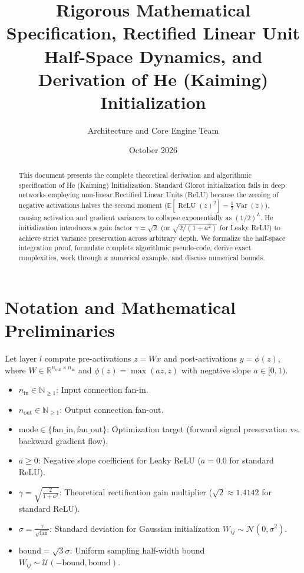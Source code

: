 \documentclass[11pt,a4paper]{article}
\title{\textbf{Rigorous Mathematical Specification, Rectified Linear Unit Half-Space Dynamics, and Derivation of He (Kaiming) Initialization}}
\author{Architecture and Core Engine Team}
\date{October 2026}
\theoremstyle{definition}
\begin{document}
\maketitle

\begin{abstract}
This document presents the complete theoretical derivation and algorithmic specification of He (Kaiming) Initialization. Standard Glorot initialization fails in deep networks employing non-linear Rectified Linear Units (ReLU) because the zeroing of negative activations halves the second moment ($\mathbb{E}[\operatorname{ReLU}(z)^2] = \frac{1}{2} \operatorname{Var}(z)$), causing activation and gradient variances to collapse exponentially as $(1/2)^L$. He initialization introduces a gain factor $\gamma = \sqrt{2}$ (or $\sqrt{2 / (1 + a^2)}$ for Leaky ReLU) to achieve strict variance preservation across arbitrary depth. We formalize the half-space integration proof, formulate complete algorithmic pseudo-code, derive exact complexities, work through a numerical example, and discuss numerical bounds.
\end{abstract}

\section{Notation and Mathematical Preliminaries}

Let layer $l$ compute pre-activations $z = W x$ and post-activations $y = \phi(z)$, where $W \in \mathbb{R}^{n_{\text{out}} \times n_{\text{in}}}$ and $\phi(z) = \max(a z, z)$ with negative slope $a \in [0, 1)$.

\begin{itemize}
    \item $n_{\text{in}} \in \mathbb{N}_{\ge 1}$: Input connection fan-in.
    \item $n_{\text{out}} \in \mathbb{N}_{\ge 1}$: Output connection fan-out.
    \item $\text{mode} \in \{\text{fan\_in}, \text{fan\_out}\}$: Optimization target (forward signal preservation vs. backward gradient flow).
    \item $a \ge 0$: Negative slope coefficient for Leaky ReLU ($a = 0.0$ for standard ReLU).
    \item $\gamma = \sqrt{\frac{2}{1 + a^2}}$: Theoretical rectification gain multiplier ($\sqrt{2} \approx 1.4142$ for standard ReLU).
    \item $\sigma = \frac{\gamma}{\sqrt{\text{fan}}}$: Standard deviation for Gaussian initialization $W_{ij} \sim \mathcal{N}(0, \sigma^2)$.
    \item $\text{bound} = \sqrt{3} \sigma$: Uniform sampling half-width bound $W_{ij} \sim \mathcal{U}(-\text{bound}, \text{bound})$.
\end{itemize}
\end{document}
